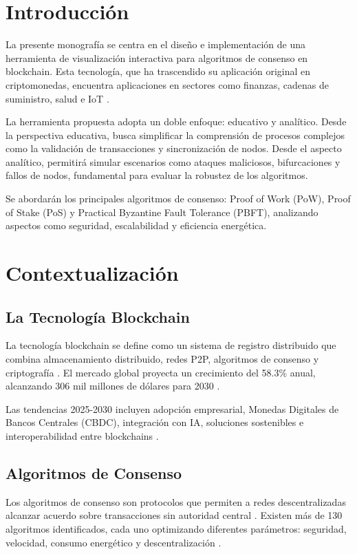 \documentclass[spanish,12pt,letterpaper]{report}
\begin{document}
\section{Introducción}
La presente monografía se centra en el diseño e implementación de una herramienta de visualización interactiva para algoritmos de consenso en blockchain. Esta tecnología, que ha trascendido su aplicación original en criptomonedas, encuentra aplicaciones en sectores como finanzas, cadenas de suministro, salud e IoT \parencite{businesswire2025blockchain}.

La herramienta propuesta adopta un doble enfoque: educativo y analítico. Desde la perspectiva educativa, busca simplificar la comprensión de procesos complejos como la validación de transacciones y sincronización de nodos. Desde el aspecto analítico, permitirá simular escenarios como ataques maliciosos, bifurcaciones y fallos de nodos, fundamental para evaluar la robustez de los algoritmos.

Se abordarán los principales algoritmos de consenso: Proof of Work (PoW), Proof of Stake (PoS) y Practical Byzantine Fault Tolerance (PBFT), analizando aspectos como seguridad, escalabilidad y eficiencia energética.

\section{Contextualización}
\subsection{La Tecnología Blockchain}
La tecnología blockchain se define como un sistema de registro distribuido que combina almacenamiento distribuido, redes P2P, algoritmos de consenso y criptografía \parencite{odu20255g}. El mercado global proyecta un crecimiento del 58.3\% anual, alcanzando 306 mil millones de dólares para 2030 \parencite{businesswire2025blockchain}.

Las tendencias 2025-2030 incluyen adopción empresarial, Monedas Digitales de Bancos Centrales (CBDC), integración con IA, soluciones sostenibles e interoperabilidad entre blockchains \parencite{charterglobal2025top}.

\subsection{Algoritmos de Consenso}
Los algoritmos de consenso son protocolos que permiten a redes descentralizadas alcanzar acuerdo sobre transacciones sin autoridad central \parencite{visa2025what}. Existen más de 130 algoritmos identificados, cada uno optimizando diferentes parámetros: seguridad, velocidad, consumo energético y descentralización \parencite{researchgate2025systematic}.
\end{document}
